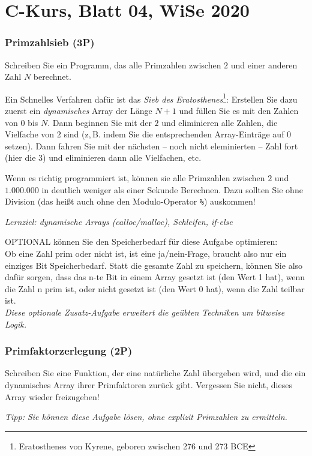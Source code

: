 \documentclass[
	ngerman,
	fontsize=10pt,
	parskip=half,
	titlepage=true,
	DIV=12
]{scrartcl}
\begin{document}
\part*{C-Kurs, Blatt 04, WiSe 2020}

\section{Primzahlsieb (3P)}
Schreiben Sie ein Programm, das alle Primzahlen zwischen $2$ und einer anderen Zahl $N$ berechnet.

Ein Schnelles Verfahren dafür ist das \emph{Sieb des Eratosthenes}\footnote
	{Eratosthenes von Kyrene, geboren zwischen 276 und 273 BCE}:
Erstellen Sie dazu zuerst ein {\em dynamisches} Array der Länge $N+1$ und füllen Sie es mit den Zahlen von $0$ bis $N$. Dann beginnen Sie mit der $2$ und eliminieren alle Zahlen, die Vielfache von $2$ sind (z,\,B. indem Sie die entsprechenden Array-Einträge auf $0$ setzen). 
Dann fahren Sie mit der nächsten -- noch nicht eleminierten -- Zahl fort (hier die $3$) und eliminieren dann alle Vielfachen, etc.

Wenn es richtig programmiert ist, können sie alle Primzahlen zwischen $2$ und $1.000.000$ in deutlich weniger als einer Sekunde Berechnen. Dazu sollten Sie ohne Division (das heißt auch ohne den Modulo-Operator \texttt{\%}) auskommen!

\emph{Lernziel: dynamische Arrays (calloc/malloc), Schleifen, if-else}

OPTIONAL können Sie den Speicherbedarf für diese Aufgabe optimieren:\\
Ob eine Zahl prim oder nicht ist, ist eine ja/nein-Frage, braucht also nur ein einziges Bit Speicherbedarf. Statt die gesamte Zahl zu speichern, können Sie also dafür sorgen, dass das n-te Bit in einem Array gesetzt ist (den Wert 1 hat), wenn die Zahl n prim ist, oder nicht gesetzt ist (den Wert 0 hat), wenn die Zahl teilbar ist.\\
\emph{Diese optionale Zusatz-Aufgabe erweitert die geübten Techniken um bitweise Logik.}


\section{Primfaktorzerlegung (2P)}
Schreiben Sie eine Funktion, der eine natürliche Zahl übergeben wird, und die ein dynamisches Array ihrer Primfaktoren zurück gibt. Vergessen Sie nicht, dieses Array wieder freizugeben!

\emph{Tipp: Sie können diese Aufgabe lösen, ohne explizit Primzahlen zu ermitteln.}
\end{document}
